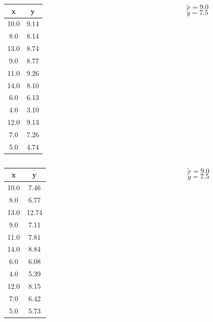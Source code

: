 \documentclass{beamer}
\begin{document}
\begin{frame}
    \Large
	\begin{columns}
		\begin{column}{.5\textwidth}
			\begin{center}
				\begin{tabular}{cc}
					\toprule
					x &      y \\
					\midrule
					10.0 & 9.14 \\
					 8.0 & 8.14 \\
					13.0 & 8.74 \\
					 9.0 & 8.77 \\
					11.0 & 9.26 \\
					14.0 & 8.10 \\
					 6.0 & 6.13 \\
					 4.0 & 3.10 \\
					12.0 & 9.13 \\
					 7.0 & 7.26 \\
					 5.0 & 4.74 \\
					\bottomrule
				\end{tabular}
			\end{center}
		\end{column}
		\begin{column}{.5\textwidth}
            \pause
            \[
            \tilde x = 9.0
            \]
            \pause
            \[
            \tilde y = 7.5
            \]
        \end{column}
	\end{columns}
\end{frame}

\begin{frame}
    \Large
	\begin{columns}
		\begin{column}{.5\textwidth}
			\begin{center}
				\begin{tabular}{cc}
					\toprule
					x &      y \\
					\midrule
					10.0 & 7.46 \\
					 8.0 & 6.77 \\
                    13.0 &12.74 \\
					 9.0 & 7.11 \\
					11.0 & 7.81 \\
					14.0 & 8.84 \\
					 6.0 & 6.08 \\
					 4.0 & 5.39 \\
					12.0 & 8.15 \\
					 7.0 & 6.42 \\
					 5.0 & 5.73 \\
					\bottomrule
				\end{tabular}
			\end{center}
		\end{column}
		\begin{column}{.5\textwidth}
            \pause
            \[
            \tilde x = 9.0
            \]
            \pause
            \[
            \tilde y = 7.5
            \]
        \end{column}
	\end{columns}
\end{frame}
\end{document}

